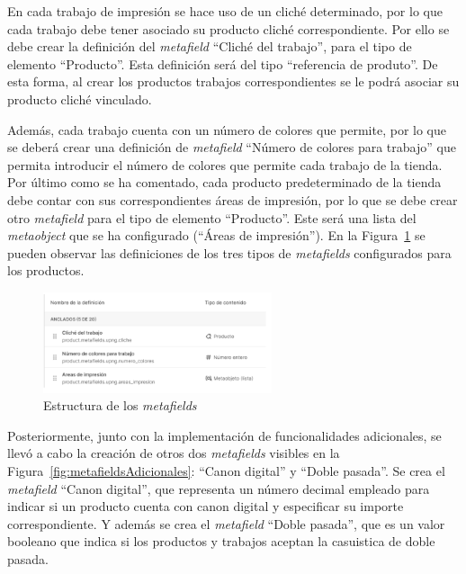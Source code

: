 \documentclass[11pt]{article}
\begin{document}
En cada trabajo de impresión se hace uso de un cliché determinado, por lo que cada trabajo debe tener asociado su producto cliché correspondiente. Por ello se debe 
crear la definición del \textit{metafield} ``Cliché del trabajo'', para el tipo de elemento ``Producto''. Esta definición será del tipo ``referencia de produto''. De esta forma, al crear los productos trabajos correspondientes se le podrá asociar su producto cliché vinculado.

Además, cada trabajo cuenta con un número de colores que permite, por lo que se deberá crear una definición de \textit{metafield} ``Número de colores para trabajo'' que permita
introducir el número de colores que permite cada trabajo de la tienda. Por último como se ha comentado, cada producto predeterminado de la tienda debe contar con sus correspondientes áreas de impresión, por lo que se debe crear otro \textit{metafield} para el tipo de elemento ``Producto''. Este será una 
lista del \textit{metaobject} que se ha configurado (``Áreas de impresión''). En la Figura~\ref{fig:metadatos} se pueden observar las definiciones de los tres tipos de \textit{metafields} configurados para los productos.

\begin{figure}[H]
    \centering
    \includegraphics[width=0.6\textwidth]{imagenesUS2/creacionMetafields.png}
    \caption{\label{fig:metadatos}Estructura de los \textit{metafields}}
    \vspace{\fill}
\end{figure}

Posteriormente, junto con la implementación de funcionalidades adicionales, se llevó a cabo la creación de otros dos \textit{metafields} visibles en la Figura~\ref{fig:metafieldsAdicionales}: ``Canon digital'' y ``Doble pasada''. 
Se crea el \textit{metafield}  ``Canon digital'', que representa un número decimal empleado para indicar si un producto cuenta con canon digital y especificar su importe correspondiente. Y además
se crea el \textit{metafield} ``Doble pasada'', que es un valor booleano que indica si los productos y trabajos aceptan la casuistica de doble pasada.
\end{document}

